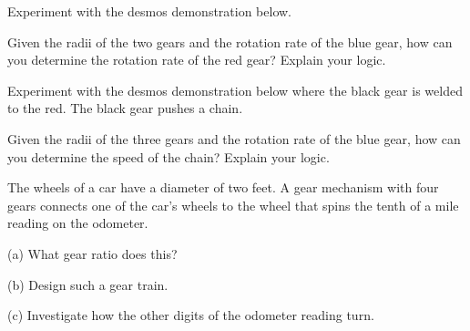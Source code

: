 \documentclass{ximera}
\begin{document}
\begin{question}  \label{Q3242:Angles}
Experiment with the desmos demonstration below. 

Given the radii of the two gears and the rotation rate of the blue gear, how can you determine the rotation rate of the red gear? Explain your logic.

 
\begin{onlineOnly}
    \begin{center}
\end{center}
\end{onlineOnly}
\end{question}




\begin{question}  \label{Q1764:Angles}
Experiment with the desmos demonstration below where the black gear is welded to the red. The black gear pushes a chain.  

Given the radii of the three gears and the rotation rate of the blue gear, how can you determine the speed of the chain? Explain your logic.

 
\begin{onlineOnly}
    \begin{center}
\end{center}
\end{onlineOnly}
\end{question}







\begin{question}  \label{Q323342:Angles}
The wheels of a car have a diameter of two feet. A gear mechanism with four gears connects one of the car's wheels to the wheel that spins the tenth of a mile reading on the odometer.

(a) What gear ratio does this?

(b) Design such a gear train.

(c) Investigate how the other digits of the odometer reading turn.
\end{question}
\end{document}
